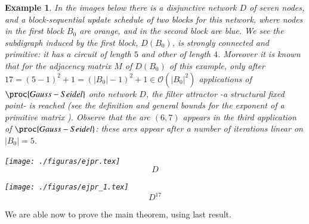 \documentclass[preprint,12pt]{elsarticle}
\newtheorem{exmp}{Example}
\begin{document}
\begin{exmp}
In the images below there is a disjunctive network $D$ of seven nodes, and a block-sequential update schedule of two blocks for this network, where nodes in the first block $B_0$ are orange, and in the second block are blue. We see the subdigraph induced by the first block, $D(B_0)$, is strongly connected and primitive: it has a circuit of length $5$ and other of length $4$. Moreover it is known that for the adjacency matrix $M$ of $D(B_0)$ of this example, only after $17=(5-1)^2+1=(|B_0|-1)^2+1 \in \mathcal{O}(|B_0|^2)$ applications of $\proc{Gauss-Seidel}$ onto network $D$, the filter attractor -a structural fixed point- is reached (see the definition and general bounds for the exponent of a primitive matrix \cite{mat_book}). Observe that the arc $(6,7)$ appears in the third application of $\proc{Gauss-Seidel}$: these arcs appear after a number of iterations linear on $|B_0|=5$.

\begin{multicols}{2}
\begin{center}
\texttt{[image: ./figuras/ejpr.tex]}
$$D$$
\end{center}
\begin{center}
\texttt{[image: ./figuras/ejpr\_1.tex]}
$$D^{17}$$
\end{center}
\end{multicols}
\end{exmp}

We are able now to prove the main theorem, using last result.
\end{document}
